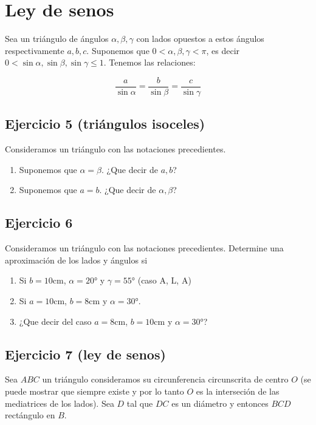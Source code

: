 \section{Ley de senos}

Sea un triángulo de ángulos $\alpha, \beta, \gamma$ con lados opuestos a estos
ángulos respectivamente $a,b,c$. Suponemos que
$0 < \alpha, \beta, \gamma < \pi$, es decir
$0 < \sin \alpha, \sin \beta, \sin \gamma \leq 1$. Tenemos las relaciones:

$$
\frac{a}{\sin \alpha} = \frac{b}{\sin \beta} =  \frac{c}{\sin \gamma}
$$

\subsection{Ejercicio 5 (triángulos isoceles)}

Consideramos un triángulo con las notaciones precedientes.

\begin{enumerate}
  \item Suponemos que $\alpha = \beta$. ¿Que decir de $a,b$?
  \item Suponemos que $a=b$. ¿Que decir de $\alpha, \beta$?
\end{enumerate}

\subsection{Ejercicio 6}

Consideramos un triángulo con las notaciones precedientes. Determine una
aproximación de los lados y ángulos si

\begin{enumerate}
  \item Si $b=\text{10cm}$, $\alpha = 20°$ y $\gamma = 55°$ (caso A, L, A)
  \item Si $a=\text{10cm}$, $b=\text{8cm}$ y $\alpha = 30°$.
  \item ¿Que decir del caso 
    $a=\text{8cm}$, $b=\text{10cm}$ y $\alpha=30°$?
\end{enumerate}

\subsection{Ejercicio 7 (ley de senos)}

Sea $ABC$ un triángulo consideramos su circunferencia circunscrita de centro
$O$ (se puede mostrar que siempre existe y por lo tanto $O$ es la interseción
de las mediatrices de los lados). Sea $D$ tal que $DC$ es un diámetro
y entonces $BCD$ rectángulo en $B$.

